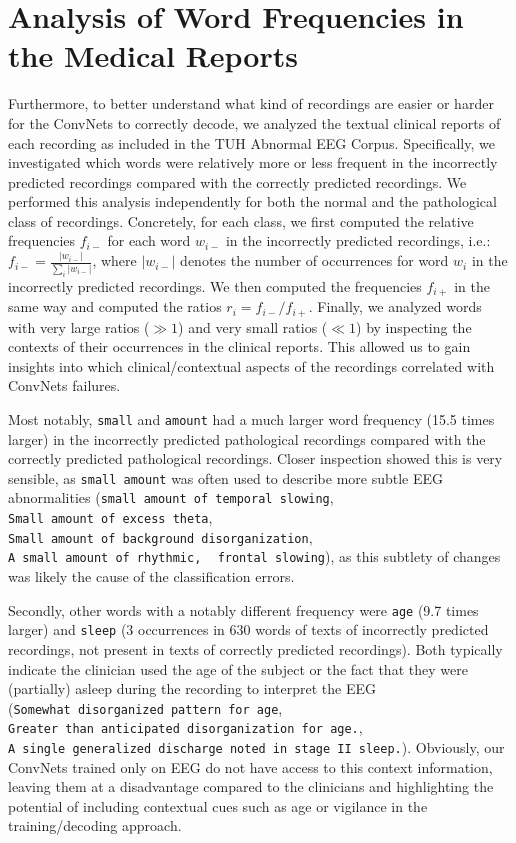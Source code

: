     \hypertarget{analysis-of-word-frequencies-in-the-medical-reports}{%
\section{Analysis of Word Frequencies in the Medical
Reports}\label{analysis-of-word-frequencies-in-the-medical-reports}}

    Furthermore, to better understand what kind of recordings are easier or
harder for the ConvNets to correctly decode, we analyzed the textual
clinical reports of each recording as included in the TUH Abnormal EEG
Corpus. Specifically, we investigated which words were relatively more
or less frequent in the incorrectly predicted recordings compared with
the correctly predicted recordings. We performed this analysis
independently for both the normal and the pathological class of
recordings. Concretely, for each class, we first computed the relative
frequencies $f_{i-}$ for each word $w_{i-}$ in the incorrectly
predicted recordings, i.e.:
$f_{i-} = \frac{|w_{i-}|}{\sum_{i}|w_{i-}|}$, where $|w_{i-}|$
denotes the number of occurrences for word $w_i$ in the incorrectly
predicted recordings. We then computed the frequencies $f_{i+}$ in the
same way and computed the ratios $r_i=f_{i-}/f_{i+}$. Finally, we
analyzed words with very large ratios ($\gg1$) and very small ratios
($\ll1$) by inspecting the contexts of their occurrences in the
clinical reports. This allowed us to gain insights into which
clinical/contextual aspects of the recordings correlated with ConvNets
failures.

Most notably, \texttt{small} and \texttt{amount} had a much larger word
frequency (15.5 times larger) in the incorrectly predicted pathological
recordings compared with the correctly predicted pathological
recordings. Closer inspection showed this is very sensible, as
\texttt{small\ amount} was often used to describe more subtle EEG
abnormalities (\texttt{small\ amount\ of\ temporal\ slowing},~
\texttt{Small\ amount\ of\ excess\ theta},~
\texttt{Small\ amount\ of\ background\ disorganization}, ~
\texttt{A\ small\ amount\ of\ rhythmic,} ~ \texttt{frontal\ slowing}), as this
subtlety of changes was likely the cause of the classification errors.

Secondly, other words with a notably different frequency were
\texttt{age} (9.7 times larger) and \texttt{sleep} (3 occurrences in 630
words of texts of incorrectly predicted recordings, not present in texts
of correctly predicted recordings). Both typically indicate the
clinician used the age of the subject or the fact that they were
(partially) asleep during the recording to interpret the EEG
(\texttt{Somewhat\ disorganized\ pattern\ for\ age},~
\texttt{Greater\ than\ anticipated\ disorganization\ for\ age.},~
\texttt{A\ single\ generalized\ discharge\ noted\ in\ stage\ II\ sleep.}).
Obviously, our ConvNets trained only on EEG do not have access to this
context information, leaving them at a disadvantage compared to the
clinicians and highlighting the potential of including contextual cues
such as age or vigilance in the training/decoding approach.

